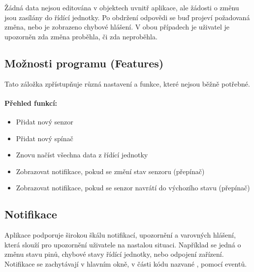 \documentclass[FM,DP]{tulthesis}  %
\begin{document}
Žádná data nejsou editována v objektech uvnitř aplikace, ale žádosti o změnu jsou zasílány do řídící jednotky. Po obdržení odpovědi se buď projeví požadovaná změna, nebo je zobrazeno chybové hlášení. V obou případech je uživatel je upozorněn zda změna proběhla, či zda neproběhla.

\subsection{Možnosti programu (Features)}
Tato záložka zpřístupňuje různá nastavení a funkce, které nejsou běžně potřebné.

\paragraph{Přehled funkcí:}
\begin{itemize}
\item Přidat nový senzor
\item Přidat nový spínač
\item Znovu načíst všechna data z řídící jednotky
\item Zobrazovat notifikace, pokud se změní stav senzoru (přepínač)
\item Zobrazovat notifikace, pokud se senzor navrátí do výchozího stavu (přepínač)
\end{itemize} 

\subsection{Notifikace}
Aplikace podporuje širokou škálu notifikací, upozornění a varovných hlášení, která slouží pro upozornění uživatele na nastalou situaci. Například se jedná o změnu stavu pinů, chybové stavy řídící jednotky, nebo odpojení zařízení. Notifikace se zachytávají v hlavním okně, v části kódu nazvané , pomocí eventů.
\end{document}
